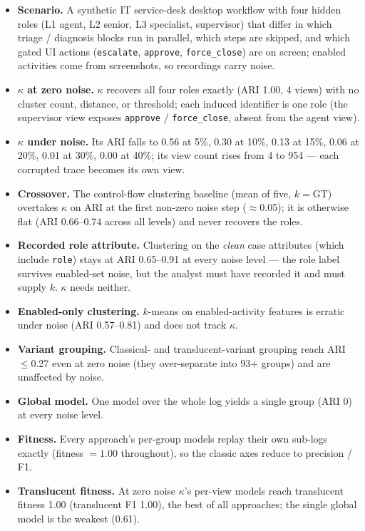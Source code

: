 \begin{itemize}
\item \textbf{Scenario.} A synthetic IT service-desk desktop workflow with four hidden roles (L1 agent, L2 senior, L3 specialist, supervisor) that differ in which triage / diagnosis blocks run in parallel, which steps are skipped, and which gated UI actions (\texttt{escalate}, \texttt{approve}, \texttt{force\_close}) are on screen; enabled activities come from screenshots, so recordings carry noise.
\item \textbf{$\kappa$ at zero noise.} $\kappa$ recovers all four roles exactly (ARI 1.00, 4 views) with no cluster count, distance, or threshold; each induced identifier is one role (the supervisor view exposes \texttt{approve} / \texttt{force\_close}, absent from the agent view).
\item \textbf{$\kappa$ under noise.} Its ARI falls to 0.56 at 5\%, 0.30 at 10\%, 0.13 at 15\%, 0.06 at 20\%, 0.01 at 30\%, 0.00 at 40\%; its view count rises from 4 to 954 --- each corrupted trace becomes its own view.
\item \textbf{Crossover.} The control-flow clustering baseline (mean of five, $k=\mathrm{GT}$) overtakes $\kappa$ on ARI at the first non-zero noise step ($\approx$0.05); it is otherwise flat (ARI 0.66--0.74 across all levels) and never recovers the roles.
\item \textbf{Recorded role attribute.} Clustering on the \emph{clean} case attributes (which include \texttt{role}) stays at ARI 0.65--0.91 at every noise level --- the role label survives enabled-set noise, but the analyst must have recorded it and must supply $k$. $\kappa$ needs neither.
\item \textbf{Enabled-only clustering.} $k$-means on enabled-activity features is erratic under noise (ARI 0.57--0.81) and does not track $\kappa$.
\item \textbf{Variant grouping.} Classical- and translucent-variant grouping reach ARI $\le$0.27 even at zero noise (they over-separate into 93+ groups) and are unaffected by noise.
\item \textbf{Global model.} One model over the whole log yields a single group (ARI 0) at every noise level.
\item \textbf{Fitness.} Every approach's per-group models replay their own sub-logs exactly (fitness $=1.00$ throughout), so the classic axes reduce to precision / F1.
\item \textbf{Translucent fitness.} At zero noise $\kappa$'s per-view models reach translucent fitness 1.00 (translucent F1 1.00), the best of all approaches; the single global model is the weakest (0.61).

\end{itemize}
